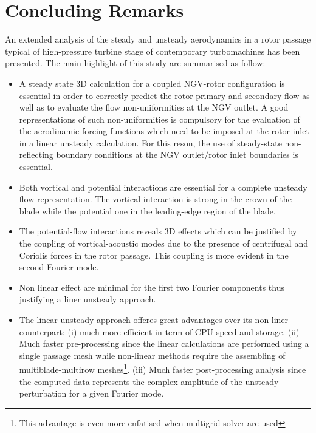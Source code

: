 %
%
%
%
\section{Concluding Remarks}
\label{rt27_conclusions.sec}
%
 An extended analysis of the steady and unsteady aerodynamics
 in a rotor passage typical of high-pressure turbine stage
 of contemporary turbomachines has been presented.
 The main highlight of this study are summarised as follow:
%
\begin{itemize}
%
\item
 A steady state 3D calculation for a coupled NGV-rotor
 configuration is essential in order to correctly predict the rotor
 primary and secondary flow as well as to evaluate the flow non-uniformities
 at the NGV outlet. A good representations of such non-uniformities is
 compulsory for the evaluation of the aerodinamic forcing functions which
 need to be imposed at the rotor inlet in a linear unsteady calculation.
 For this reson, the use of steady-state non-reflecting boundary conditions
 at the NGV outlet/rotor inlet boundaries is essential.
%
\item
 Both vortical and potential interactions are essential for a complete
 unsteady flow representation. The vortical interaction is strong
 in the crown of the blade while the potential one in the leading-edge
 region of the blade.
%
\item
 The potential-flow interactions reveals 3D effects
 which can be justified by the coupling of vortical-acoustic modes
 due to the presence of centrifugal and Coriolis forces in the
 rotor passage. This coupling is more evident in the second
 Fourier mode.
%
\item
 Non linear effect are minimal for the first two Fourier components thus
 justifying a liner unsteady approach.
%
\item
 The linear unsteady approach offeres great advantages over its non-liner
 counterpart: (i) much more efficient in term of CPU speed and storage.
 (ii) Much faster pre-processing since the linear calculations are
 performed using a single passage mesh while non-linear methods
 require the assembling of multiblade-multirow meshes\footnote{This advantage is
 even more enfatised when multigrid-solver are used}.
 (iii) Much faster post-processing analysis since the computed data
 represents the complex amplitude of the unsteady perturbation for a given
 Fourier mode.
\end{itemize}
%
 
